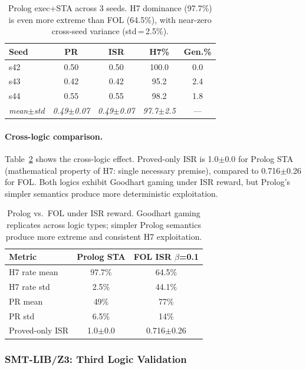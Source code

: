 \documentclass[11pt,a4paper]{article}
\begin{document}
\begin{table}[t]
\centering
\small
\begin{tabular}{lcccc}
\toprule
\textbf{Seed} & \textbf{PR} & \textbf{ISR} & \textbf{H7\%} & \textbf{Gen.\%} \\
\midrule
s42 & 0.50 & 0.50 & 100.0 & 0.0 \\
s43 & 0.42 & 0.42 & 95.2 & 2.4 \\
s44 & 0.55 & 0.55 & 98.2 & 1.8 \\
\midrule
\textit{mean$\pm$std} & \textit{0.49$\pm$0.07} & \textit{0.49$\pm$0.07} & \textit{97.7$\pm$2.5} & --- \\
\bottomrule
\end{tabular}
\caption{Prolog exec+STA across 3 seeds. H7 dominance (97.7\%) is even more extreme than FOL (64.5\%), with near-zero cross-seed variance (std\,=\,2.5\%).}
\label{tab:prolog_sta}
\end{table}

\paragraph{Cross-logic comparison.}
Table~\ref{tab:cross_logic} shows the cross-logic effect.
Proved-only ISR is 1.0$\pm$0.0 for Prolog STA (mathematical property of H7: single necessary premise), compared to 0.716$\pm$0.26 for FOL.
Both logics exhibit Goodhart gaming under ISR reward, but Prolog's simpler semantics produce more deterministic exploitation.

\begin{table}[t]
\centering
\small
\setlength{\tabcolsep}{3pt}
\begin{tabular}{lcc}
\toprule
\textbf{Metric} & \textbf{Prolog STA} & \textbf{FOL ISR $\beta$=0.1} \\
\midrule
H7 rate mean & 97.7\% & 64.5\% \\
H7 rate std & 2.5\% & 44.1\% \\
PR mean & 49\% & 77\% \\
PR std & 6.5\% & 14\% \\
Proved-only ISR & 1.0$\pm$0.0 & 0.716$\pm$0.26 \\
\bottomrule
\end{tabular}
\caption{Prolog vs.\ FOL under ISR reward. Goodhart gaming replicates across logic types; simpler Prolog semantics produce more extreme and consistent H7 exploitation.}
\label{tab:cross_logic}
\end{table}

\subsubsection{SMT-LIB/Z3: Third Logic Validation}
\label{sec:smt}
\end{document}

